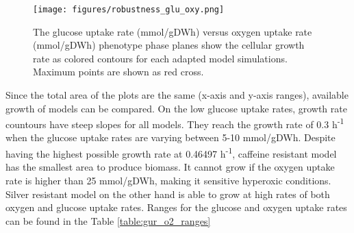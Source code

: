 \begin{figure}[H]
  \begin{center}
  \texttt{[image: figures/robustness\_glu\_oxy.png]}
  \caption[The glucose uptake rate (mmol/gDWh) versus oxygen uptake rate (mmol/gDWh) phenotype phase planes show the cellular growth rate as colored contours for each adapted model simulations]{The glucose uptake rate (mmol/gDWh) versus oxygen uptake rate (mmol/gDWh) phenotype phase planes show the cellular growth rate as colored contours for each adapted model simulations. Maximum points are shown as red cross.}
  \label{fig:robustness_glu_oxy}
  \end{center}
  \end{figure}
\vspace{-1.0cm}

 Since the total area of the plots are the same (x-axis and y-axis ranges), available growth of models can be compared. On the low glucose uptake rates, growth rate countours have steep slopes for all models. They reach the growth rate of 0.3 h\textsuperscript{-1} when the glucose uptake rates are varying between 5-10 mmol/gDWh. Despite having the highest possible growth rate at 0.46497 h\textsuperscript{-1}, caffeine resistant model has the smallest area to produce biomass. It cannot grow if the oxygen uptake rate is higher than 25 mmol/gDWh, making it sensitive hyperoxic conditions. Silver resistant model on the other hand is able to grow at high rates of both oxygen and glucose uptake rates. Ranges for the glucose and oxygen uptake rates can be found in the Table \ref{table:gur_o2_ranges}

